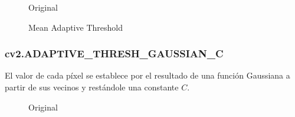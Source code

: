 \begin{figure}[H]
  \caption{Original}
  \centering \setlength\fboxsep{0pt} \setlength\fboxrule{0.5pt}
\end{figure}

\begin{figure}[H]
  \centering \setlength\fboxsep{0pt} \setlength\fboxrule{0.5pt}
  \caption{Mean Adaptive Threshold}
\end{figure}

\subsubsection{cv2.ADAPTIVE\_THRESH\_GAUSSIAN\_C}\label{tecnica:threshold-adaptativo-gauss}
El valor de cada píxel se establece por el resultado de una función
Gaussiana a partir de sus vecinos y restándole una constante $C$.

\begin{figure}[H]
  \caption{Original}
  \centering \setlength\fboxsep{0pt} \setlength\fboxrule{0.5pt}
\end{figure}

